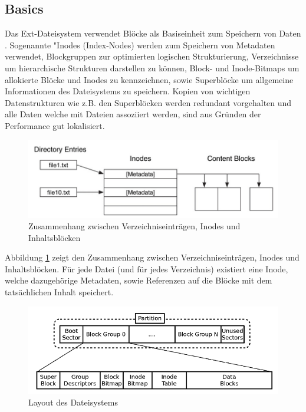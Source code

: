 \subsection{Basics}

Das Ext-Dateisystem verwendet Blöcke als Basiseinheit zum Speichern von Daten \cite{Ext2.07.01.2022}. Sogenannte "Inodes (Index-Nodes) werden zum Speichern von Metadaten verwendet, Blockgruppen zur optimierten logischen Strukturierung, Verzeichnisse um hierarchische Strukturen darstellen zu können, Block- und Inode-Bitmaps um allokierte Blöcke und Inodes zu kennzeichnen, sowie Superblöcke um allgemeine Informationen des Dateisystems zu speichern. Kopien von wichtigen Datenstrukturen wie z.B. den Superblöcken werden redundant vorgehalten und alle Daten welche mit Dateien assoziiert werden, sind aus Gründen der Performance gut lokalisiert\cite{Carrier.06.01.2022}.

\begin{figure}[H]
	\centering
	\includegraphics[width=12cm,keepaspectratio=true]{pictures/ext1.png}
	\caption{
		Zusammenhang zwischen Verzeichniseinträgen, Inodes und Inhaltsblöcken \cite{Carrier.06.01.2022}
	}
	\label{fig:ext1}
\end{figure}

Abbildung \ref{fig:ext1} zeigt den Zusammenhang zwischen Verzeichniseinträgen, Inodes und Inhaltsblöcken. Für jede Datei (und für jedes Verzeichnis) existiert eine Inode, welche dazugehörige Metadaten, sowie Referenzen auf die Blöcke mit dem tatsächlichen Inhalt speichert.

\begin{figure}[H]
	\centering
	\includegraphics[width=12cm,keepaspectratio=true]{pictures/layout.png}
	\caption{
		Layout des Dateisystems \cite{AnalysisExt4.07.01.2022}
	}
	\label{fig:layout}
\end{figure}

